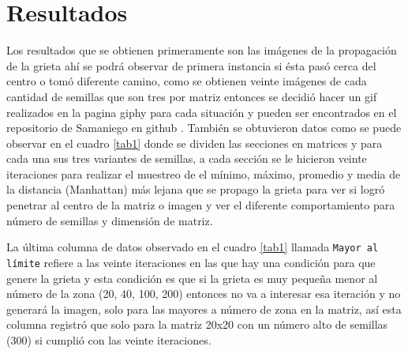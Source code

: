 \documentclass[a4paper, 11pt]{article}
\begin{document}
\section{Resultados}
Los resultados que se obtienen primeramente son las imágenes de la propagación de la grieta ahí se podrá observar de primera instancia si ésta pasó cerca del centro o tomó diferente camino, como se obtienen veinte imágenes de cada cantidad de semillas que son tres por matriz entonces se decidió hacer un gif realizados en la pagina giphy \cite{GIPHY} para cada situación y pueden ser encontrados en el repositorio de Samaniego en github \cite{Edson}.
También se obtuvieron datos como se puede observar en el cuadro \ref{tab1} donde se dividen las secciones en matrices y para cada una sus tres variantes de semillas, a cada sección se le hicieron veinte iteraciones para realizar el muestreo de el mínimo, máximo, promedio y media de la distancia (Manhattan) más lejana que se propago la grieta para ver si logró penetrar al centro de la matriz o imagen y ver el diferente comportamiento para número de semillas y dimensión de matriz. 

La última columna de datos observado en el cuadro \ref{tab1} llamada \texttt{Mayor al límite} refiere a las veinte iteraciones en las que hay una condición para que genere la grieta y esta condición es que si la grieta es muy pequeña menor al número de la zona (20, 40, 100, 200) entonces no va a interesar esa iteración y no generará la imagen, solo para las mayores a número de zona en la matriz, así esta columna registró que solo para la matriz 20x20 con un número alto de semillas (300) si cumplió con las veinte iteraciones.
\end{document}
